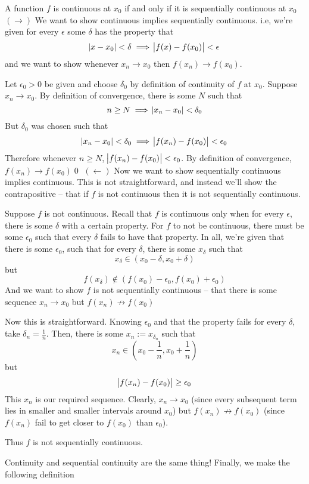 \begin{SWP}{\thm}{A function $f$ is continuous at $x_0$ if and only if it is sequentially continuous at $x_0$}$(\rightarrow)$ We want to show continuous implies sequentially continuous. i.e, we're given for every $\epsilon$ some $\delta$ has the property that$$\abs{x - x_0} < \delta \implies \abs{f(x) - f(x_0)} < \epsilon$$and we want to show whenever $x_n \rightarrow x_0$ then $f(x_n) \rightarrow f(x_0)$.

Let $\epsilon_0 > 0$ be given and choose $\delta_0$ by definition of continuity of $f$ at $x_0$. Suppose $x_n \rightarrow x_0$. By definition of convergence, there is some $N$ such that
$$
n \geq N \implies \abs{x_n - x_0} < \delta_0
$$
But $\delta_0$ was chosen such that
$$
\abs{x_n - x_0} < \delta_0 \implies \abs{f(x_n) - f(x_0)} < \epsilon_0
$$
Therefore whenever $n \geq N$, $\abs{f(x_n) - f(x_0)} < \epsilon_0$. By definition of convergence, $f(x_n) \rightarrow f(x_0)$\qed
\newpage
$(\leftarrow)$ Now we want to show sequentially continuous implies continuous. This is not straightforward, and instead we'll show the contrapositive -- that if $f$ is not continuous then it is not sequentially continuous. 

Suppose $f$ is not continuous. Recall that $f$ is continuous only when for every $\epsilon$, there is some $\delta$ with a certain property. For $f$ to not be continuous, there must be some $\epsilon_0$ such that every $\delta$ fails to have that property. In all, we're given that there is some $\epsilon_0$, such that for every $\delta$, there is some $x_\delta$ such that
$$
x_\delta \in (x_0 - \delta, x_0 + \delta)
$$
but
$$
f(x_\delta) \notin (f(x_0) - \epsilon_0, f(x_0) + \epsilon_0)
$$
And we want to show $f$ is not sequentially continuous -- that there is some sequence $x_n \rightarrow x_0$ but $f(x_n) \not\rightarrow f(x_0)$

Now this is straightforward. Knowing $\epsilon_0$ and that the property fails for every $\delta$, take $\delta_n = \frac{1}{n}$. Then, there is some $x_n := x_{\delta_n}$ such that
$$
x_n \in (x_0 - \dfrac 1 n, x_0 + \dfrac 1 n)
$$
but
$$
\abs{f(x_n) - f(x_0)} \geq \epsilon_0
$$
This $x_n$ is our required sequence. Clearly, $x_n \rightarrow x_0$ (since every subsequent term lies in smaller and smaller intervals around $x_0$) but $f(x_n) \not\rightarrow f(x_0)$ (since $f(x_n)$ fail to get closer to $f(x_0)$ than $\epsilon_0$).

Thus $f$ is not sequentially continuous.
\end{SWP}
Continuity and sequential continuity are the same thing! Finally, we make the following definition

